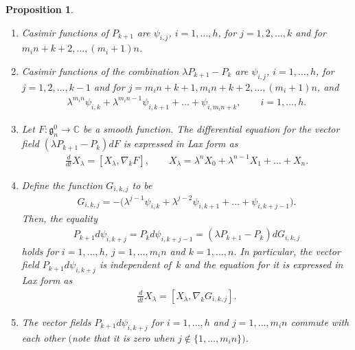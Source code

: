 \documentclass[10pt,a4paper]{amsart}
\numberwithin{equation}{section}
\newtheorem{Proposition}[Theorem]{Proposition}
 { \theoremstyle{definition}
\newtheorem{Example}[Theorem]{Example}}
\begin{document}
\begin{Proposition}\label{proposition2.3}\quad
\begin{enumerate}\itemsep=0pt
\item[$(i)$] Casimir functions of $P_{k+1}$ are $\psi_{i,j}$, $i=1,{\dots},h$, for $j=1,2,{\dots},k$ and for  $m_in+k+2,\dots ,(m_i+1)n$.

\item[$(ii)$] Casimir functions of the combination $\lambda P_{k+1} - P_k$ are $\psi_{i,j}$, $i=1,\dots ,h$, for $j=1,2,\dots ,k-1$ and for $j=m_in+k+1, m_in+k+2,\dots ,(m_i+1)n$, and
\begin{gather*}
\lambda ^{m_in}\psi_{i,k} + \lambda ^{m_in-1}\psi_{i, k+1}+ \dots +\psi_{i,m_in+k}, \qquad i=1,\dots ,h.
\end{gather*}
\item[$(iii)$] Let $F\colon \mathfrak{g}^0_n \to \mathbb{C}$ be a smooth function. The differential equation for the vector field $(\lambda P_{k+1} - P_k)dF$ is expressed in
Lax form as
\begin{gather*}
\frac{d}{dt}X_\lambda = [X_\lambda , \nabla _kF], \qquad X_\lambda =\lambda ^nX_0+\lambda ^{n-1}X_1+\dots +X_n.
\end{gather*}
\item[$(iv)$] Define the function $G_{i,k,j}$ to be
\begin{gather*}
G_{i,k,j} = -\big( \lambda ^{j-1}\psi_{i,k} + \lambda ^{j-2} \psi_{i,k+1} + \dots + \psi_{i,k+j-1}\big).
\end{gather*}
Then, the equality
\begin{gather*}
P_{k+1}d\psi_{i,k+j} = P_kd\psi_{i,k+j-1} = (\lambda P_{k+1}-P_k)dG_{i,k,j}
\end{gather*}
holds for $i=1,\dots ,h$, $j=1,\dots ,m_in$ and $k=1,\dots ,n$. In particular, the vector field $P_{k+1}d\psi_{i,k+j}$ is independent of~$k$ and the equation for it is expressed in Lax form as
\begin{gather*}
\frac{d}{dt}X_\lambda = [X_\lambda , \nabla _kG_{i,k,j}].
\end{gather*}
\item[$(v)$] The vector fields $P_{k+1}d\psi_{i,k+j}$ for $i=1,\dots ,h$ and $j=1,\dots , m_in$ commute with each other $($note that it is zero when $j\notin \{ 1,\dots ,m_in\})$.
\end{enumerate}
\end{Proposition}
\end{document}
